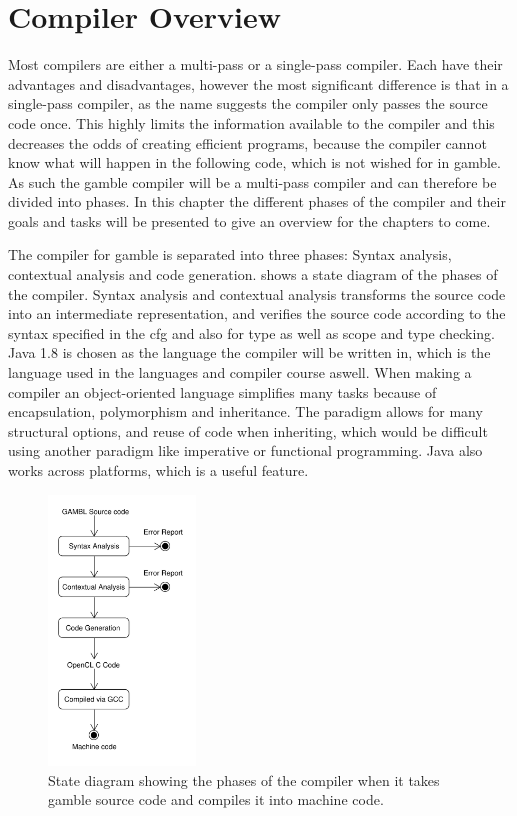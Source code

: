 \chapter{Compiler Overview}\label{Chp:CompilerOverview}
Most compilers are either a multi-pass or a single-pass compiler. 
Each have their advantages and disadvantages, however the most significant difference is that in a single-pass compiler, as the name suggests the compiler only passes the source code once. 
This highly limits the information available to the compiler and this decreases the odds of creating efficient programs, because the compiler cannot know what will happen in the following code, which is not wished for in \gls{gamble}. 
As such the \gls{gamble} compiler will be a multi-pass compiler and can therefore be divided into phases.
In this chapter the different phases of the compiler and their goals and tasks will be presented to give an overview for the chapters to come.

The compiler for \gls{gamble} is separated into three phases: Syntax analysis, contextual analysis and code generation.
 shows a state diagram of the phases of the compiler.
Syntax analysis and contextual analysis transforms the source code into an intermediate representation, and verifies the source code according to the syntax specified in the \acrshort{cfg} and also for type as well as scope and type checking.
Java 1.8 is chosen as the language the compiler will be written in, which is the language used in the languages and compiler course aswell.
When making a compiler an object-oriented language simplifies many tasks because of encapsulation, polymorphism and inheritance. 
The paradigm allows for many structural options, and reuse of code when inheriting, which would be difficult using another paradigm like imperative or functional programming.
Java also works across platforms, which is a useful feature.

\begin{figure}[ht]
\centering
\includegraphics[width=0.35\textwidth]{figures/ClassDiagrams/CompilerDiagram.pdf}
\caption{State diagram showing the phases of the compiler when it takes \gls{gamble} source code and compiles it into machine code.}\label{fig:phases}
\end{figure}
\vspace{20pt}

